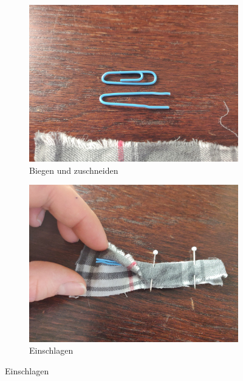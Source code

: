 \documentclass[12pt,parskip=full]{scrartcl}
\begin{document}
\begin{figure}[hb]
    \vspace{0.5cm}
    \centering
    \begin{subfigure}{0.48\textwidth}
        \centering
        \includegraphics[width = \linewidth]{Pictures/02_MetalStrip/MetalStrip_01_resized.jpg}
        \caption{Biegen und zuschneiden}
        \label{MetaStrip1}
    \end{subfigure}
    \begin{subfigure}{0.48\textwidth}
        \centering
        \includegraphics[width = \linewidth]{Pictures/02_MetalStrip/MetalStrip_02_resized.jpg}
        \caption{Einschlagen}
        \label{MetaStrip2}
    \end{subfigure}

\end{figure}
\end{document}
